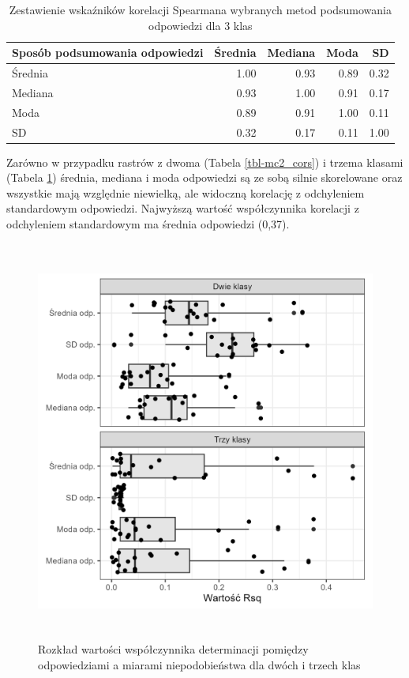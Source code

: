 \documentclass{amuthesis}
\begin{document}
\hypertarget{tbl-mc3_cors}{}
\begin{table}
\caption{\label{tbl-mc3_cors}Zestawienie wskaźników korelacji Spearmana wybranych metod podsumowania
odpowiedzi dla 3 klas }\tabularnewline

\centering
\begin{tabular}{lrrrr}
\toprule
Sposób podsumowania
odpowiedzi & Średnia & Mediana & Moda & SD\\
\midrule
Średnia & 1.00 & 0.93 & 0.89 & 0.32\\
Mediana & 0.93 & 1.00 & 0.91 & 0.17\\
Moda & 0.89 & 0.91 & 1.00 & 0.11\\
SD & 0.32 & 0.17 & 0.11 & 1.00\\
\bottomrule
\end{tabular}
\end{table}

Zarówno w przypadku rastrów z dwoma (Tabela \ref{tbl-mc2_cors}) i trzema
klasami (Tabela \ref{tbl-mc3_cors}) średnia, mediana i moda odpowiedzi
są ze sobą silnie skorelowane oraz wszystkie mają względnie niewielką,
ale widoczną korelację z odchyleniem standardowym odpowiedzi. Najwyższą
wartość współczynnika korelacji z odchyleniem standardowym ma średnia
odpowiedzi (0,37).

\begin{figure}[t]

{\centering \includegraphics[width=5.20833in,height=5.20833in]{figures/rsq_vs_metody_agregacji_odp.png}

}

\caption{\label{fig-rsq_vs_metody_agregacji_odp}Rozkład wartości
współczynnika determinacji pomiędzy odpowiedziami a miarami
niepodobieństwa dla dwóch i trzech klas}

\end{figure}
\end{document}
